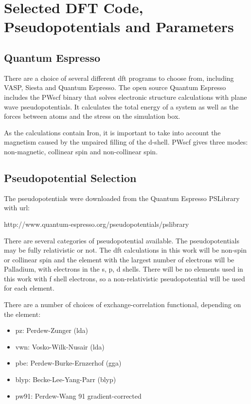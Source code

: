 \FloatBarrier
\section[DFT Settings]{Selected DFT Code, Pseudopotentials and Parameters}


\subsection{Quantum Espresso}

There are a choice of several different \acrshort{dft} programs to choose from, including VASP, Siesta and Quantum Espresso.  The open source Quantum Espresso includes the PWscf binary that solves electronic structure calculations with plane wave pseudopotentials.  It calculates the total energy of a system as well as the forces between atoms and the stress on the simulation box.  

As the calculations contain Iron, it is important to take into account the magnetism caused by the unpaired filling of the d-shell.  PWscf gives three modes: non-magnetic, collinear spin and non-collinear spin.  



\subsection{Pseudopotential Selection}

The pseudopotentials were downloaded from the Quantum Espresso PSLibrary with \acrshort{url}:

http://www.quantum-espresso.org/pseudopotentials/pslibrary 

There are several categories of pseudopotential available.  The pseudopotentials may be fully relativistic or not.  The \acrshort{dft} calculations in this work will be non-spin or collinear spin and the element with the largest number of electrons will be Palladium, with electrons in the s, p, d shells.  There will be no elements used in this work with f shell electrons, so a non-relativistic pseudopotential will be used for each element.

There are a number of choices of exchange-correlation functional, depending on the element:

\begin{itemize}
\item pz: Perdew-Zunger (\acrshort{lda})
\item vwn: Vosko-Wilk-Nusair (\acrshort{lda})
\item pbe: Perdew-Burke-Ernzerhof (\acrshort{gga})
\item blyp: Becke-Lee-Yang-Parr (\acrshort{blyp})
\item pw91: Perdew-Wang 91 gradient-corrected 
\end{itemize}

